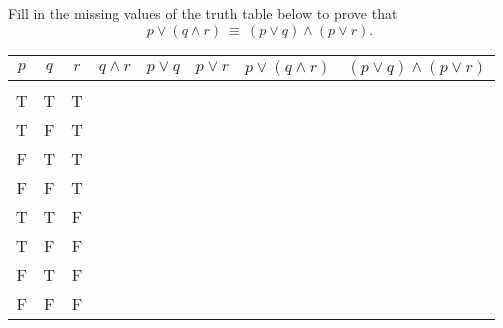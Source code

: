 \begin{try}
Fill in the missing values of the truth table below to prove that 
\[p \vee (q \wedge r)\ \equiv\ (p \vee q) \wedge (p \vee r).\]
\begin{center}
\begin{tabular}{|c c c c c c c c|}
\hline
$p$ & $q$ & $r$ & $q \wedge r$ & $p \vee q$ & $p \vee r$ & $p \vee (q \wedge r)$ & $(p \vee q) \wedge (p \vee r)$\\
\hline
& & & & & & & \\
T & T & T & & & & & \\
T & F & T & & & & & \\
F & T & T & & & & & \\
F & F & T & & & & & \\
T & T & F & & & & & \\
T & F & F & & & & & \\
F & T & F & & & & & \\
F & F & F & & & & & \\
\hline
\end{tabular}
\end{center}
\end{try}
\vfill
\pagebreak

